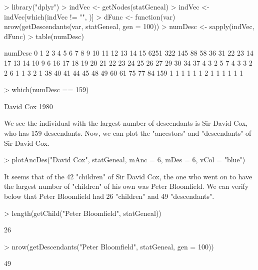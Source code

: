 \documentclass{article}
\begin{document}
\begin{Schunk}
\begin{Sinput}
> library("dplyr")
> indVec <- getNodes(statGeneal)
> indVec <- indVec[which(indVec != "", )]
> dFunc <- function(var) nrow(getDescendants(var, statGeneal, gen = 100))
> numDesc <- sapply(indVec, dFunc)
> table(numDesc)
\end{Sinput}
\begin{Soutput}
numDesc
   0    1    2    3    4    5    6    7    8    9   10   11   12   13   14   15 
6251  322  145   88   58   36   31   22   23   14   17   13   14   10    9    6 
  16   17   18   19   20   21   22   23   24   25   26   27   29   30   34   37 
   4    3    2    5    7    4    3    3    2    2    6    1    1    3    2    1 
  38   40   41   44   45   48   49   60   61   75   77   84  159 
   1    1    1    1    1    1    2    1    1    1    1    1    1 
\end{Soutput}
\begin{Sinput}
> which(numDesc == 159)
\end{Sinput}
\begin{Soutput}
David Cox 
     1980 
\end{Soutput}
\end{Schunk}

We see the individual with the largest number of descendants is Sir David Cox, who has 159 descendants. Now, we can plot the "ancestors" and "descendants" of Sir David Cox.

\begin{Schunk}
\begin{Sinput}
> plotAncDes("David Cox", statGeneal, mAnc = 6, mDes = 6, vCol = "blue")
\end{Sinput}
\end{Schunk}

It seems that of the 42 "children" of Sir David Cox, the one who went on to have the largest number of "children" of his own was Peter Bloomfield. We can verify below that Peter Bloomfield had 26 "children" and 49 "descendants".

\begin{Schunk}
\begin{Sinput}
> length(getChild("Peter Bloomfield", statGeneal))
\end{Sinput}
\begin{Soutput}
[1] 26
\end{Soutput}
\begin{Sinput}
> nrow(getDescendants("Peter Bloomfield", statGeneal, gen = 100))
\end{Sinput}
\begin{Soutput}
[1] 49
\end{Soutput}
\end{Schunk}
\end{document}
